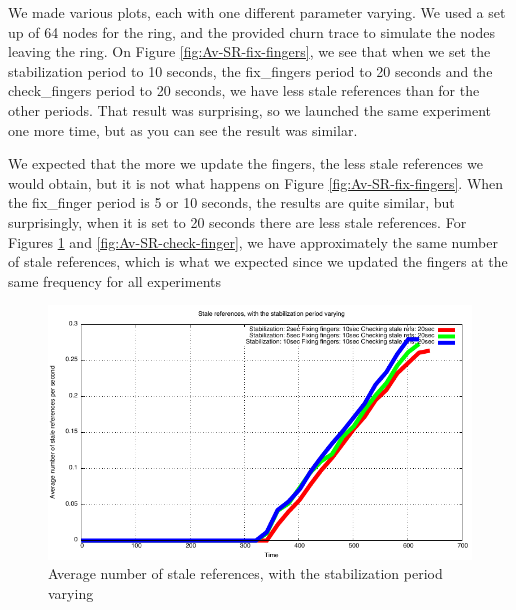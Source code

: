 \documentclass[a4paper, 11pt]{article}
\theoremstyle{plain}
\theoremstyle{definition}
\begin{document}
    We made various plots, each with
    one different parameter varying. We used a set up of 64 nodes for the ring, and the provided churn trace
    to simulate the nodes leaving the ring. On Figure \ref{fig:Av-SR-fix-fingers}, we see that when we set the
    stabilization period to 10 seconds, the fix\_fingers period to 20 seconds and the check\_fingers period to
    20 seconds, we have less stale references than for the other periods. That result was surprising, so we
    launched the same experiment one more time, but as you can see the result was similar.

    We expected that the more we update the fingers, the less stale references we would obtain, but it is not
    what happens on Figure \ref{fig:Av-SR-fix-fingers}. When the fix\_finger period is 5 or 10 seconds, the
    results are quite similar, but surprisingly, when it is set to 20 seconds there are less stale
    references. For Figures \ref{fig:Av-SR-stab} and \ref{fig:Av-SR-check-finger}, we have approximately the
    same number of stale references, which is what we expected since we updated the fingers at the same
    frequency for all experiments

    \begin{figure}[h]
      \centering
      \includegraphics{plots/Average-SR-stabilization.pdf}
      \caption{Average number of stale references, with the stabilization period varying}
      \label{fig:Av-SR-stab}
    \end{figure}
    
\end{document}
